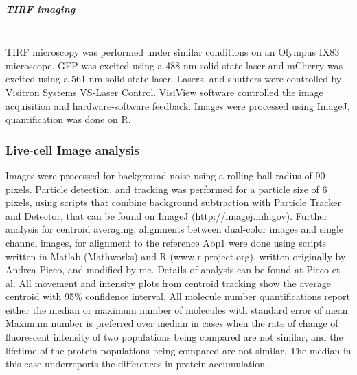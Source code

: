 \subparagraph{TIRF imaging}
			\mbox{}\\
TIRF microscopy was performed under similar conditions on an Olympus IX83 microscope. GFP was excited using a 488 nm solid state laser and mCherry was excited using a 561 nm solid state laser. Lasers, and shutters were controlled by Visitron Systems VS-Laser Control. VisiView software controlled the image acquisition and hardware-software feedback.
Images were processed using ImageJ, quantification was done on R.

\subsubsection{Live-cell Image analysis}
Images were processed for background noise using a rolling ball radius of 90 pixels. Particle detection, and tracking was performed for a particle size of 6 pixels, using scripts that combine background subtraction with Particle Tracker and Detector, that can be found on ImageJ (http://imagej.nih.gov). Further analysis for centroid averaging, alignments between dual-color images and single channel images, for alignment to the reference Abp1 were done using scripts written in Matlab (Mathworks) and R (www.r-project.org), written originally by Andrea Picco, and modified by me. Details of analysis can be found at Picco et al. All movement and intensity plots from centroid tracking show the average centroid with 95\% confidence interval. All molecule number quantifications report either the median or maximum number of molecules with standard error of mean. Maximum number is preferred over median in cases when the rate of change of fluorescent intensity of two populations being compared are not similar, and the lifetime of the protein populations being compared are not similar. The median in this case underreports the differences in protein accumulation. 


